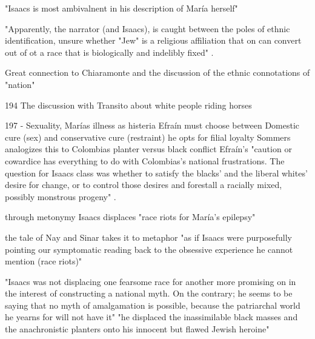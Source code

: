 "Isaacs is most ambivalnent in his description of María herself" \cite[192]{Sommer1991}

"Apparently, the narrator (and Isaacs), is caught between the poles of ethnic identification, unsure whether "Jew" is a religious affiliation that on can convert out of ot a race that is biologically and indelibly fixed" \cite[194]{Sommer1991}.

Great connection to Chiaramonte and the discussion of the ethnic connotations of "nation"

194 The discussion with Transito about white people riding horses

197 -
Sexuality, Marías illness as histeria
Efraín must choose between Domestic cure (sex) and conservative cure (restraint) he opts for filial loyalty
Sommers analogizes this to Colombias planter versus black conflict
Efraín's "caution or cowardice has everything to do with Colombias's national frustrations. The question for Isaacs class was whether to satisfy the blacks' and the liberal whites' desire for change, or to control those desires and forestall a racially mixed, possibly monstrous progeny" \cite[198]{Sommer1991}.

through metonymy Isaacs displaces "race riots for María's epilepsy" \cite[200]{Sommer1991}

the tale of Nay and Sinar takes it to metaphor
"as if Isaacs were purposefully pointing our symptomatic reading back to the obsessive experience he cannot mention (race riots)" \cite[200]{Sommer1991}

"Isaacs was not displacing one fearsome race for another more promising on in the interest of constructing a national myth. On the contrary; he seems to be saying that no myth of amalgamation is possible, because the patriarchal world he yearns for will not have it"
"he displaced the inassimilable black masses and the anachronistic planters onto his innocent but flawed Jewish heroine" \cite[202]{Sommer1991}